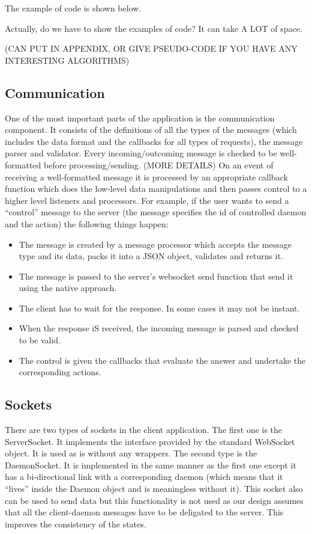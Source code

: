 \documentclass{l3proj}
\begin{document}
The example of code is shown below.

Actually, do we have to show the examples of code? It can take A LOT of space.

(CAN PUT IN APPENDIX, OR GIVE PSEUDO-CODE IF YOU HAVE ANY INTERESTING ALGORITHMS)

\subsection{Communication}

One of the most important parts of the application is the communication component. It consists of the definitions of all the types of the messages (which includes the data format and the callbacks for all types of requests), the message parser and validator. Every incoming/outcoming message is checked to be well-formatted before processing/sending. (MORE DETAILS) On an event of receiving a well-formatted message it is processed by an appropriate callback function which does the low-level data manipulations and then passes control to a higher level listeners and processors. For example, if the user wants to send a ``control'' message to the server (the message specifies the id of controlled daemon and the action) the following things happen:
\begin{itemize}
  \item The message is created by a message processor which accepts the message type and its data, packs it into a JSON object, validates and returns it.
  \item The message is passed to the server's websocket send function that send it using the native approach.
  \item The client has to wait for the response. In some cases it may not be instant.
  \item When the response iS received, the incoming message is parsed and checked to be valid.
  \item The control is given the callbacks that evaluate the answer and undertake the corresponding actions.
\end{itemize}

\subsection{Sockets}

There are two types of sockets in the client application. The first one is the ServerSocket. It implements the interface provided by the standard WebSocket object. It is used as is without any wrappers. The second type is the DaemonSocket. It is implemented in the same manner as the first one except it has a bi-directional link with a corresponding daemon (which means that it ``lives'' inside the Daemon object and is meaningless without it). This socket also can be used to send data but this functionality is not used as our design assumes that all the client-daemon messages have to be deligated to the server. This improves the consistency of the states.
\end{document}
